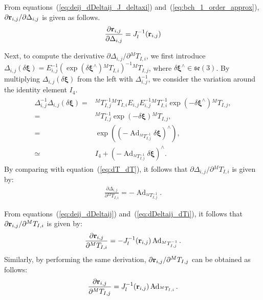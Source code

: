 From equations~(\ref{eq:deij_dDeltaij_J_deltaxi}) and~(\ref{eq:bch_1_order_approx}), $\partial {\bf r}_{i, j} / \partial \Delta_{i, j}$ is given as follows.
%
\begin{align}
  \frac{ \partial {\bf r}_{i, j} }{ \partial \Delta_{i, j} } = J_{l}^{-1}( {\bf r}_{i, j} )
  \label{eq:deij_dDeltaij}
\end{align}
%

Next, to compute the derivative $\partial \Delta_{i, j} / \partial {}^{M}T_{I, i}$, we first introduce
$\Delta_{i, j} \left( \delta \boldsymbol \xi \right) = E_{i, j}^{-1} \left( \exp \left( \delta \boldsymbol \xi^{\wedge} \right) {}^{M}T_{I, i} \right)^{-1} {}^{M}T_{I, j}$, where $\delta \boldsymbol \xi^{\wedge} \in \mathfrak{se}(3)$.
By multiplying $\Delta_{i, j} \left( \delta \boldsymbol \xi \right)$ from the left with $\Delta_{i, j}^{-1}$, we consider the variation around the identity element $I_{4}$.
%
\begin{align}
  \begin{split}
    \Delta_{i, j}^{-1} \Delta_{i, j} \left( \delta \boldsymbol \xi \right)
%
    = & {}^{M}T_{I, j}^{-1} {}^{M}T_{I, i} E_{i, j} E_{i, j}^{-1} {}^{M}T_{I, i}^{-1} \exp \left( -\delta \boldsymbol \xi^{\wedge} \right) {}^{M}T_{I, j}, \\
%
    = & {}^{M}T_{I, j}^{-1} \exp \left( -\delta \boldsymbol \xi \right) {}^{M}T_{I, j}, \\
%
    = & \exp \left( \left( -\operatorname{Ad}_{ {}^{M}T_{I, j}^{-1} } \delta \boldsymbol \xi \right)^{\wedge} \right), \\
    \simeq & I_{4} + \left( -\operatorname{Ad}_{ {}^{M}T_{I, j}^{-1} } \delta \boldsymbol \xi \right)^{\wedge}.
%
  \end{split}
\end{align}
%
By comparing with equation~(\ref{eq:dT_dT}), it follows that $\partial \Delta_{i, j} / \partial {}^{M}T_{I, i}$ is given by:
%
\begin{align}
  \frac{ \partial \Delta_{i, j} }{ \partial {}^{M}T_{I, i} } = - \operatorname{Ad}_{ {}^{M}T_{I, j}^{-1} }.
  \label{eq:dDeltaij_dTi}
\end{align}
%

From equations~(\ref{eq:deij_dDeltaij}) and~(\ref{eq:dDeltaij_dTi}), it follows that $\partial {\bf r}_{i, j} / \partial {}^{M}T_{I, i}$ is given by:
%
\begin{align}
  \frac{ \partial {\bf r}_{i, j} }{ \partial {}^{M}T_{I, i} } = -J_{l}^{-1}( {\bf r}_{i, j} ) \operatorname{Ad}_{ {}^{M}T_{I, j}^{-1} }.
  \label{eq:deij_dTi}
\end{align}
%
Similarly, by performing the same derivation, $\partial {\bf r}_{i, j} / \partial {}^{M}T_{I, j}$ can be obtained as follows:
%
\begin{align}
  \frac{ \partial {\bf r}_{i, j} }{ \partial {}^{M}T_{I, j} } = J_{l}^{-1}( {\bf r}_{i, j} ) \operatorname{Ad}_{ {}^{M}T_{I, i} }.
  \label{eq:deij_dTj}
\end{align}



